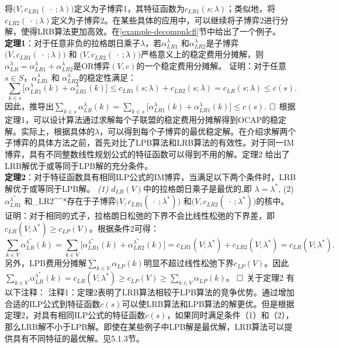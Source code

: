 \documentclass[UTF8]{article}
\begin{document}
    将$\big(V,c_{LR1}(\ \cdot\ ;\lambda)\big)$定义为子博弈1，其特征函数为$c_{LR1}(s;\lambda)$；类似地，将$c_{LR2}(\ \cdot\ ;\lambda)$定义为子博弈2。在某些具体的应用中，可以继续将子博弈2进行分解，使得LRB算法更加高效。在\ref{example-decompnlcfl}节中给出了一个例子。\\
    \textbf{定理1}：对于任意非负的拉格朗日乘子$\lambda$，若$\alpha_{LR1}^{\lambda}$ 和$\alpha_{LR2}^{\lambda}$是子博弈$\big(V,c_{LR1}(\ \cdot\ ;\lambda)\big)$ 和 $\big(V,c_{LR2}(\ \cdot\ ;\lambda)\big)$严格意义上的稳定费用分摊解，则$\alpha_{LR}^{\lambda} = \alpha_{LR1}^{\lambda} + \alpha_{LR2}^{\lambda}$是OR博弈$(V,c)$的一个稳定费用分摊解。
    证明：对于任意$s \in S$，$\alpha_{LR1}^{\lambda}$ 和 $\alpha_{LR2}^{\lambda}$的稳定性满足：
    \begin{equation*}\label{eqn:feasibilitysgcost}
     \sum_{k \in s}\big[\alpha_{LR1}^{\lambda}(k) + \alpha_{LR1}^{\lambda}(k)\big] \leq c_{LR1}(s;\lambda) + c_{LR2}(s;\lambda) = c_{LR}(s;\lambda) \leq c(s).
    \end{equation*}
    因此，推导出$\sum_{k \in s} \alpha_{LR}^{\lambda}(k) = \sum_{k \in s}\big[\alpha_{LR1}^{\lambda}(k) + \alpha_{LR1}^{\lambda}(k)\big] \leq c(s)$.
    $\hfill\square$
    根据定理1，可以设计算法通过求解每个子联盟的稳定费用分摊解得到OCAP的稳定解。实际上，根据具体的$\lambda$，可以得到每个子博弈的最优稳定解。在介绍求解两个子博弈的具体方法之前，首先对比了LPB算法和LRB算法的有效性。对于同一IM博弈，具有不同整数线性规划公式的特征函数可以得到不用的解。定理2 给出了LRB解优于或等同于LPB解的充分条件。\\
    \textbf{定理2}：对于特征函数具有相同ILP公式的IM博弈，当满足以下两个条件时，LRB解优于或等同于LPB解。
    {\em (1)} $d_{LR}(V)$中的拉格朗日乘子是最优的,即 $\lambda = \lambda^*$,
    {\rm  (2)} $\alpha_{LR1}^{\lambda^*}$ 和\alpha_{LR2}^{\lambda^*}$  存在于子博弈(V,c_{LR1}(\ \cdot\ ;\lambda^*)\big)$ 和$\big(V,c_{LR2}(\ \cdot\ ;\lambda^*)\big)$的核中。
    证明：对于相同的式子，拉格朗日松弛的下界不会比线性松弛的下界差，即$c_{LR}(V;\lambda^*) \geq c_{LP}(V)$。根据条件2可得：
    $$\sum_{k \in V} \alpha_{LR}^{\lambda^*}(k) = \sum_{k \in V} \big[\alpha_{LR1}^{\lambda^*}(k) + \alpha_{LR2}^{\lambda^*}(k)\big] = c_{LR1}(V;\lambda^*) + c_{LR2}(V;\lambda^*) = c_{LR}(V;\lambda^*).$$
    另外，LPB费用分摊解$\sum_{k \in V}\alpha_{LP}(k)$明显不超过线性松弛下界$c_{LP}(V)$。因此$\sum_{k \in V} \alpha_{LR}^{\lambda^*}(k) = c_{LR}(V;\lambda^*) \geq c_{LP}(V) \geq \sum_{k \in V}\alpha_{LP}(k)$。
    $\hfill\square$
    关于定理2 有以下注释：
    注释1：定理2表明了LRB算法相较于LPB算法的竞争优势。通过增加合适的ILP公式到特征函数$c(s)$可以使LRB算法和LPB算法的解更优。但是根据定理2，对具有相同ILP公式的特征函数$c(s)$，如果同时满足条件（1）和（2），那么LRB解不小于LPB解。即使在某些例子中LPB解是最优解，LRB算法可以提供具有不同特征的最优解。见5.1.3节。
\end{document}
